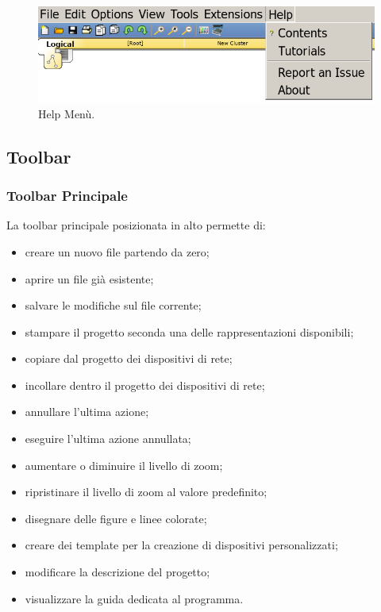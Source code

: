 \begin{figure}[htbp]
    \centering
    \includegraphics[scale=.3]{images/02.packet-tracer/help.png}
    \caption{Help Menù.}
\end{figure}

\subsection{Toolbar}

\subsubsection{Toolbar Principale}
La toolbar principale posizionata in alto permette di:

\begin{itemize}
    \item creare un nuovo file partendo da zero;
    \item aprire un file già esistente;
    \item salvare le modifiche sul file corrente;
    \item stampare il progetto seconda una delle rappresentazioni disponibili;
    \item copiare dal progetto dei dispositivi di rete;
    \item incollare dentro il progetto dei dispositivi di rete;
    \item annullare l'ultima azione;
    \item eseguire l'ultima azione annullata;
    \item aumentare o diminuire il livello di zoom;
    \item ripristinare il livello di zoom al valore predefinito;
    \item disegnare delle figure e linee colorate;
    \item creare dei template per la creazione di dispositivi personalizzati;
    \item modificare la descrizione del progetto;
    \item visualizzare la guida dedicata al programma.
\end{itemize}

